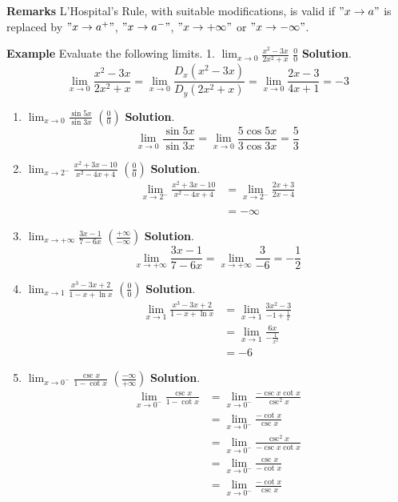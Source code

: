 \documentclass[
  letterpaper,
  DIV=11,
  numbers=noendperiod]{scrartcl}
\begin{document}
\leavevmode{}%
\textbf{Remarks} L'Hospital's Rule, with suitable modifications, is
valid if \("x \to a"\) is replaced by \("x \to a^+"\), \("x \to a^-"\),
\("x \to +\infty"\) or \("x \to -\infty"\).

\leavevmode{}%
\textbf{Example} Evaluate the following limits. 1.
\(\displaystyle\lim_{x \to 0} \frac{x^2-3x}{2x^2+x}\) \(\frac{0}{0}\)
\textbf{Solution}. \[
\displaystyle\lim_{x \to 0} \frac{x^2-3x}{2x^2+x}=\displaystyle\lim_{x \to 0} \frac{D_x\left(x^2-3x\right)}{D_y\left(2x^2+x\right)}=\displaystyle\lim_{x \to 0} \frac{2x-3}{4x+1}=-3
\]

\begin{enumerate}
\def\labelenumi{\arabic{enumi}.}
\setcounter{enumi}{1}
\item
  \(\displaystyle\lim_{x \to 0} \frac{\sin5x}{\sin3x}\)
  \(\left(\frac{0}{0}\right)\) \textbf{Solution}. \[
  \displaystyle\lim_{x \to 0} \frac{\sin5x}{\sin3x}=\displaystyle\lim_{x \to 0} \frac{5\cos5x}{3\cos3x}=\frac{5}{3}
  \]
\item
  \(\displaystyle\lim_{x \to 2^-} \frac{x^2+3x-10}{x^2-4x+4}\)
  \(\left(\frac{0}{0}\right)\) \textbf{Solution}. \[
  \begin{aligned}
  \displaystyle\lim_{x \to 2^-} \frac{x^2+3x-10}{x^2-4x+4}&=\displaystyle\lim_{x \to 2^-}\frac{2x+3}{2x-4}\\&\\&=-\infty
  \end{aligned}
  \]
\item
  \(\displaystyle\lim_{x \to +\infty}\frac{3x-1}{7-6x}\)
  \(\left(\frac{+\infty}{-\infty}\right)\) \textbf{Solution}. \[
  \displaystyle\lim_{x \to +\infty}\frac{3x-1}{7-6x}=\displaystyle\lim_{x \to +\infty} \frac{3}{-6}=-\frac{1}{2}
  \]
\item
  \(\displaystyle\lim_{x \to 1} \frac{x^3-3x+2}{1-x+\ln x}\)
  \(\left(\frac{0}{0}\right)\) \textbf{Solution}. \[
  \begin{aligned}
  \displaystyle\lim_{x \to 1} \frac{x^3-3x+2}{1-x+\ln x}&=\displaystyle\lim_{x \to 1}\frac{3x^2-3}{-1+\frac{1}{x}}\\&=\displaystyle\lim_{x \to 1}\frac{6x}{-\frac{1}{x^2}}\\&=-6
  \end{aligned}
  \]
\item
  \(\displaystyle\lim_{x \to 0^-}\frac{\csc x}{1-\cot x}\)
  \(\left(\frac{-\infty}{+\infty}\right)\) \textbf{Solution}. \[
  \begin{aligned}
  \displaystyle\lim_{x \to 0^-}\frac{\csc x}{1-\cot x}&=\displaystyle\lim_{x \to 0^-}\frac{-\csc x \cot x}{\csc^2 x}\\&=\displaystyle\lim_{x \to 0^-}\frac{-\cot x}{\csc x}\\&=\displaystyle\lim_{x \to 0^-} \frac{\csc^2 x}{-\csc x \cot x}\\&=\displaystyle\lim_{x \to 0^-}\frac{\csc x}{-\cot x}\\&=\displaystyle\lim_{x \to 0^-}\frac{-\cot x}{\csc x}
  \end{aligned}
  \]
\end{enumerate}
\end{document}
